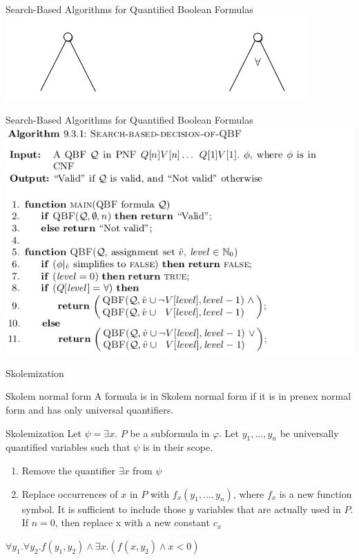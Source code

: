 \documentclass{beamer}
\begin{document}
\begin{frame}{Search-Based Algorithms for Quantified Boolean Formulas}
\includegraphics[scale=0.5]{cdcl1.png}
\end{frame}

\begin{frame}{Search-Based Algorithms for Quantified Boolean Formulas}
\includegraphics[scale=0.5]{cdcl2.png}
\end{frame}

\begin{frame}{Skolemization}
\begin{block}{Skolem normal form}
A formula is in Skolem normal form if it is in prenex normal form and has only universal quantifiers.
\end{block}
\begin{block}{Skolemization}
Let $\psi = \exists x$. $P$ be a subformula in $\varphi$. Let $y_1, \dots, y_n$ be universally quantified variables such that $\psi$ is
in their scope.
\begin{enumerate}
\item Remove the quantifier $\exists x$ from $\psi$
\item Replace occurrences of $x$ in $P$ with $f_x(y_1, \dots, y_n)$, where $f_x$ is a new function symbol. It is sufficient to include
those $y$ variables that are actually used in $P$. If $n = 0$, then replace x with a new constant $c_x$
\end{enumerate}
\end{block}
$\forall y_1.\forall y_2.f(y_1, y_2) \wedge \exists x.(f(x, y_2) \wedge x < 0)$\newline
\end{frame}
\end{document}
